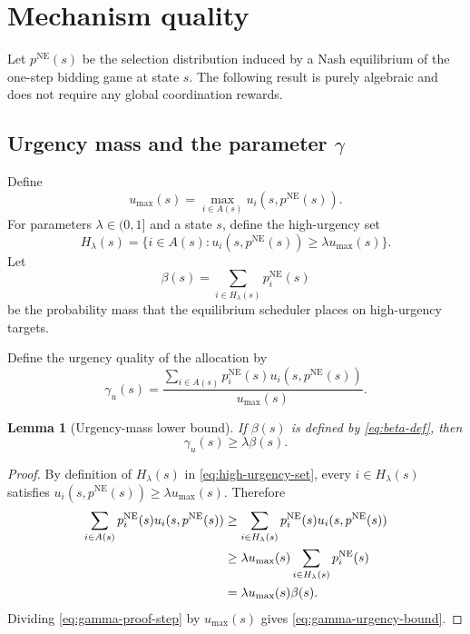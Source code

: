 \documentclass[11pt]{article}
\newtheorem{lemma}{Lemma}
\begin{document}
\section{Mechanism quality}

Let $p^{\mathrm{NE}}(s)$ be the selection distribution induced by a Nash equilibrium of the one-step bidding game
at state $s$. The following result is purely algebraic and does not require any global coordination rewards.

\subsection{Urgency mass and the parameter $\gamma$}

Define
\begin{equation}
  u_{\max}(s)
  =
  \max_{i\in A(s)} u_i(s,p^{\mathrm{NE}}(s)).
  \label{eq:u-max}
\end{equation}
For parameters $\lambda\in(0,1]$ and a state $s$, define the high-urgency set
\begin{equation}
  H_\lambda(s)
  =
  \{i\in A(s): u_i(s,p^{\mathrm{NE}}(s))\ge \lambda u_{\max}(s)\}.
  \label{eq:high-urgency-set}
\end{equation}
Let
\begin{equation}
  \beta(s)
  =
  \sum_{i\in H_\lambda(s)} p_i^{\mathrm{NE}}(s)
  \label{eq:beta-def}
\end{equation}
be the probability mass that the equilibrium scheduler places on high-urgency targets.

Define the urgency quality of the allocation by
\begin{equation}
  \gamma_u(s)
  =
  \frac{\sum_{i\in A(s)} p_i^{\mathrm{NE}}(s)u_i(s,p^{\mathrm{NE}}(s))}{u_{\max}(s)} .
  \label{eq:gamma-u}
\end{equation}

\begin{lemma}[Urgency-mass lower bound]
If $\beta(s)$ is defined by \eqref{eq:beta-def}, then
\begin{equation}
  \gamma_u(s) \ge \lambda \beta(s).
  \label{eq:gamma-urgency-bound}
\end{equation}
\end{lemma}

\begin{proof}
By definition of $H_\lambda(s)$ in \eqref{eq:high-urgency-set}, every $i\in H_\lambda(s)$ satisfies
$u_i(s,p^{\mathrm{NE}}(s))\ge \lambda u_{\max}(s)$. Therefore
\begin{align}
  \sum_{i\in A(s)} p_i^{\mathrm{NE}}(s)u_i(s,p^{\mathrm{NE}}(s))
  &\ge
  \sum_{i\in H_\lambda(s)} p_i^{\mathrm{NE}}(s)u_i(s,p^{\mathrm{NE}}(s)) \notag\\
  &\ge
  \lambda u_{\max}(s)
  \sum_{i\in H_\lambda(s)}p_i^{\mathrm{NE}}(s) \notag\\
  &=
  \lambda u_{\max}(s)\beta(s). \label{eq:gamma-proof-step}
\end{align}
Dividing \eqref{eq:gamma-proof-step} by $u_{\max}(s)$ gives \eqref{eq:gamma-urgency-bound}.
\end{proof}
\end{document}
